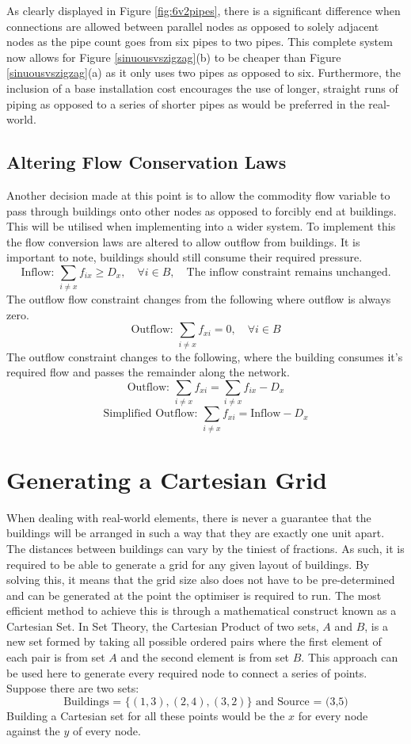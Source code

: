 As clearly displayed in Figure \ref{fig:6v2pipes}, there is a significant difference when connections are allowed between parallel nodes as opposed to solely adjacent nodes as the pipe count goes from six pipes to two pipes.\newline\newline
This complete system now allows for Figure \ref{sinuousvszigzag}(b) to be cheaper than Figure \ref{sinuousvszigzag}(a) as it only uses two pipes as opposed to six. Furthermore, the inclusion of a base installation cost encourages the use of longer, straight runs of piping as opposed to a series of shorter pipes as would be preferred in the real-world.

\subsection{Altering Flow Conservation Laws}\label{alteringflowconservation}
Another decision made at this point is to allow the commodity flow variable to pass through buildings onto other nodes as opposed to forcibly end at buildings. This will be utilised when implementing into a wider system. To implement this the flow conversion laws are altered to allow outflow from buildings. It is important to note, buildings should still consume their required pressure.
\[
\text{Inflow: }\sum_{i\neq x}f_{ix} \geq D_x,\quad\forall i\in B,\quad\text{The inflow constraint remains unchanged.}
\]
The outflow flow constraint changes from the following where outflow is always zero.
\[
\text{Outflow: }\sum_{i\neq x}f_{xi} = 0,\quad \forall i \in B 
\]
The outflow constraint changes to the following, where the building consumes it's required flow and passes the remainder along the network.
\[
\text{Outflow: }\sum_{i\neq x}f_{xi} = \sum_{i\neq x}f_{ix} - D_x
\]
\[
\text{Simplified Outflow: }\sum_{i\neq x}f_{xi} = \text{Inflow} - D_x
\]

\section{Generating a Cartesian Grid}\label{Cartesian Grid}
When dealing with real-world elements, there is never a guarantee that the buildings will be arranged in such a way that they are exactly one unit apart. The distances between buildings can vary by the tiniest of fractions. As such, it is required to be able to generate a grid for any given layout of buildings. By solving this, it means that the grid size also does not have to be pre-determined and can be generated at the point the optimiser is required to run.\newline
The most efficient method to achieve this is through a mathematical construct known as a Cartesian Set. In Set Theory, the Cartesian Product of two sets, $A$ and $B$, is a new set formed by taking all possible ordered pairs where the first element of each pair is from set $A$ and the second element is from set $B$.\newline
This approach can be used here to generate every required node to connect a series of points. Suppose there are two sets:
\[
\text{Buildings = }\{(1,3), (2,4), (3,2)\} \text{ and Source = {(3,5)}}
\]
Building a Cartesian set for all these points would be the $x$ for every node against the $y$ of every node.

